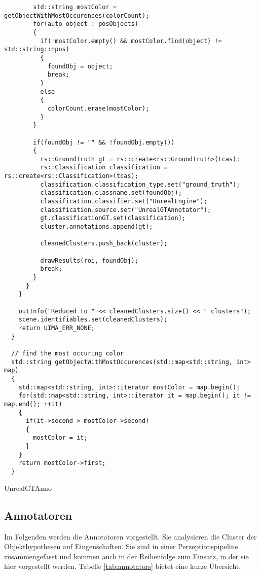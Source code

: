 \begin{algorithm}[H]
\begin{lstlisting}
        std::string mostColor = getObjectWithMostOccurences(colorCount);
        for(auto object : posObjects)
        {
          if(!mostColor.empty() && mostColor.find(object) != std::string::npos)
          {
            foundObj = object;
            break;
          }
          else
          {
            colorCount.erase(mostColor);
          }
        }

        if(foundObj != "" && !foundObj.empty())
        {
          rs::GroundTruth gt = rs::create<rs::GroundTruth>(tcas);
          rs::Classification classification = rs::create<rs::Classification>(tcas);
          classification.classification_type.set("ground_truth");
          classification.classname.set(foundObj);
          classification.classifier.set("UnrealEngine");
          classification.source.set("UnrealGTAnnotator");
          gt.classificationGT.set(classification);
          cluster.annotations.append(gt);

          cleanedClusters.push_back(cluster);

          drawResults(roi, foundObj);
          break;
        }
      }
    }

    outInfo("Reduced to " << cleanedClusters.size() << " clusters");
    scene.identifiables.set(cleanedClusters);
    return UIMA_ERR_NONE;
  }

  // find the most occuring color
  std::string getObjectWithMostOccurences(std::map<std::string, int> map)
  {
    std::map<std::string, int>::iterator mostColor = map.begin();
    for(std::map<std::string, int>::iterator it = map.begin(); it != map.end(); ++it)
    {
      if(it->second > mostColor->second)
      {
        mostColor = it;
      }
    }
    return mostColor->first;
  }
\end{lstlisting}
 \caption{UnrealGTAnno}
\end{algorithm}


\subsection{Annotatoren}

Im Folgenden werden die Annotatoren vorgestellt. Sie analysieren die Cluster der Objekthypothesen auf Eingenschaften.  Sie sind in einer Perzeptionspipeline zusammengefasst und kommen auch in der Reihenfolge zum Einsatz, in der sie hier vorgestellt werden. Tabelle \ref{tab:annotators} bietet eine kurze Übersicht.

